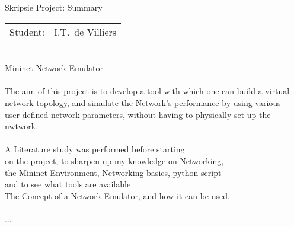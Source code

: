 
\begin{Summary}{Skripsie Project: Summary}

   \noindent
   \begin{tabular}{@{}ll@{}}
      \textsf{Student:}    &  I.T.\ de Villiers\\
   \end{tabular}

\begin{SumTable}
 \hline%
 \\
 \hline%
    Mininet Network Emulator\\
   

 \hline%
 \\
 \hline%
    The aim of this project is to develop a tool with which one can build a virtual\\
    network topology, and simulate the Network's performance by using various\\
    user defined network parameters, without having to physically set up the nwtwork.\\

 \hline%
 \\
 \hline%
    A Literature study was performed before starting\\
    on the project, to sharpen up my knowledge on Networking,\\
    the Mininet Environment, Networking basics, python script\\
    and to see what tools are available\\

    The Concept of a Network Emulator, and how it can be used.\\

 \hline%
 \\
 \hline%
    ...\\


\end{SumTable}
\end{Summary}
